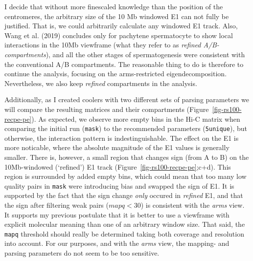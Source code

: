 \documentclass[
  11pt,
  a4paper,
]{scrbook}
\let\oldemph\emph
\renewcommand\emph[1]{\oldemph{\color{gray}#1}}
\begin{document}
I decide that without more finescaled knowledge than the position of the
centromeres, the arbitrary size of the 10 Mb windowed E1 can not fully
be justified. That is, we could arbitrarily calculate any windowed E1
track. Also, Wang et al. (2019) concludes only for pachytene
spermatocyte to show local interactions in the 10Mb viewframe (what they
refer to as \emph{refined A/B-compartments}), and all the other stages
of spermatogenesis were consistent with the conventional A/B
compartments. The reasonable thing to do is therefore to continue the
analysis, focusing on the arms-restricted eigendecomposition.
Nevertheless, we also keep \emph{refined} compartments in the analysis.

Additionally, as I created coolers with two different sets of parsing
parameters we will compare the resulting matrices and their compartments
(Figure~\ref{fig-rs100-recpe-pe}). As expected, we observe more empty
bins in the Hi-C matrix when comparing the initial run (\texttt{mask})
to the recommended parameters (\texttt{5unique}), but otherwise, the
interaction pattern is indestinguishable. The effect on the E1 is more
noticable, where the absolute magnitude of the E1 values is generally
smaller. There is, however, a small region that changes sign (from A to
B) on the 10Mb-windowed (`refined') E1 track
(Figure~\ref{fig-rs100-recpe-pe};c+d). This region is surrounded by
added empty bins, which could mean that too many low quality pairs in
\texttt{mask} were introducing bias and swapped the sign of E1. It is
supported by the fact that the sign change \emph{only} occured in
\emph{refined} E1, and that the sign after filtering weak pairs
(\(mapq < 30\)) is consistent with the \emph{arms} view. It supports my
previous postulate that it is better to use a viewframe with explicit
molecular meaning than one of an arbitrary window size. That said, the
\texttt{mapq} threshold should really be determined taking both coverage
and resolution into account. For our purposes, and with the \emph{arms}
view, the mapping- and parsing parameters do not seem to be too
sensitive.
\end{document}

